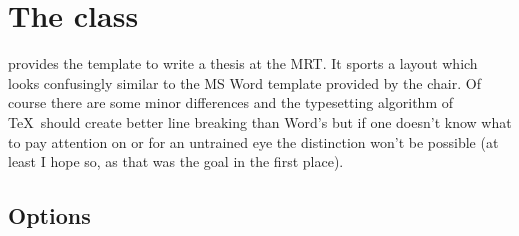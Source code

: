 \chapter{The  class}
 provides the template to write a thesis at the MRT. It sports a
layout which looks confusingly similar to the MS Word template provided by the
chair. Of course there are some minor differences and the typesetting algorithm
of \TeX\ should create better line breaking than Word's but if one doesn't know
what to pay attention on or for an untrained eye the distinction won't be
possible (at least I hope so, as that was the goal in the first place).

\section{Options}%
